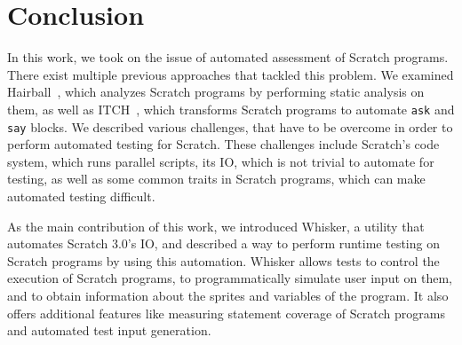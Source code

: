 \chapter{Conclusion}
\label{cha:conclusion}


In this work, we took on the issue of automated assessment of Scratch programs.
There exist multiple previous approaches that tackled this problem.
We examined Hairball~\cite{hairball}, which analyzes Scratch programs by performing static analysis on them,
as well as ITCH~\cite{itch}, which transforms Scratch programs to automate \texttt{ask} and \texttt{say} blocks.
We described various challenges, that have to be overcome in order to perform automated testing for Scratch.
These challenges include Scratch's code system, which runs parallel scripts, its IO, which is not trivial to automate for testing,
as well as some common traits in Scratch programs, which can make automated testing difficult.
\parspace

As the main contribution of this work, we introduced Whisker, a utility that automates Scratch 3.0's IO,
and described a way to perform runtime testing on Scratch programs by using this automation.
Whisker allows tests to control the execution of Scratch programs,
to programmatically simulate user input on them,
and to obtain information about the sprites and variables of the program.
It also offers additional features like measuring statement coverage of Scratch programs
and automated test input generation.
\parspace


